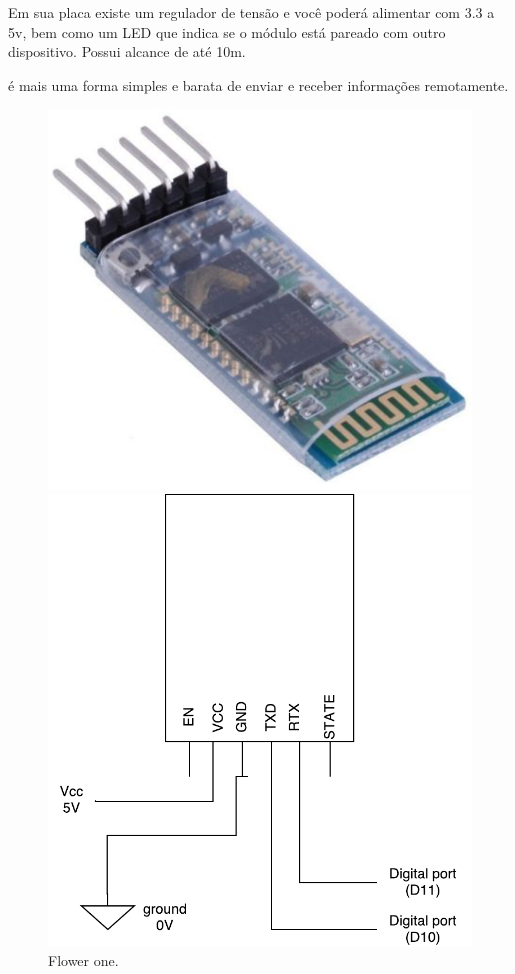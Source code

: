 Em sua placa existe um regulador de tensão e você poderá alimentar com 3.3 a 5v, bem como um LED que indica se o módulo está pareado com outro dispositivo. Possui alcance de até 10m.

 é mais uma forma simples e barata de enviar e receber informações remotamente.
 

\newpage
\begin{figure}[h]
	\centering
	\begin{minipage}[b]{0.4\textwidth}
		\includegraphics[width=\textwidth]{img/hardware/bluetooth_zs-040.png}
		\caption{Flower one.}
	\end{minipage}
	\hfill
	\begin{minipage}[b]{0.4\textwidth}
		\includegraphics[width=\textwidth]{img/comm-blue/electronic-sensors.pdf}

\end{minipage}
\end{figure}
